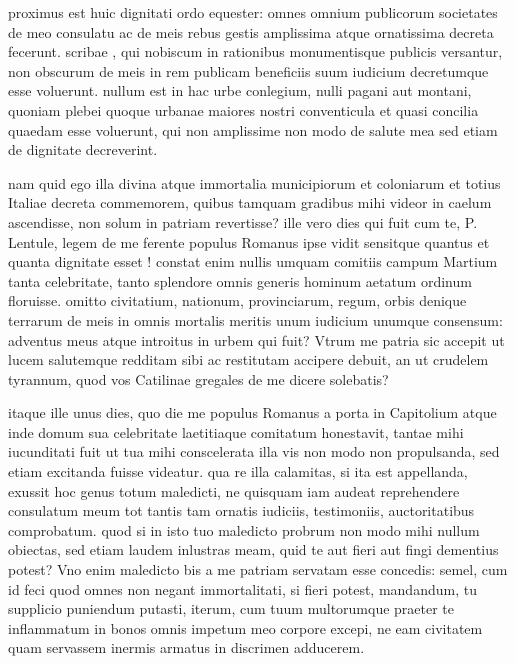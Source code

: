  proximus est huic dignitati ordo equester: omnes omnium publicorum societates de meo consulatu ac de meis rebus gestis amplissima atque ornatissima decreta fecerunt. scribae , qui nobiscum in rationibus monumentisque publicis versantur, non obscurum de meis in rem publicam beneficiis suum iudicium decretumque esse voluerunt. nullum est in hac urbe conlegium, nulli pagani aut montani, quoniam plebei quoque urbanae maiores nostri conventicula et quasi concilia quaedam esse voluerunt, qui non amplissime non modo de salute mea sed etiam de dignitate decreverint.

 nam quid ego illa divina atque immortalia municipiorum et coloniarum et totius Italiae decreta commemorem, quibus tamquam gradibus mihi videor in caelum ascendisse, non solum in patriam revertisse? ille vero dies qui fuit cum te, P. Lentule, legem de me ferente populus Romanus ipse vidit sensitque quantus et quanta dignitate esset ! constat enim nullis umquam comitiis campum Martium tanta celebritate, tanto splendore omnis generis hominum aetatum ordinum floruisse. omitto civitatium, nationum, provinciarum, regum, orbis denique terrarum de meis in omnis mortalis meritis unum iudicium unumque consensum: adventus meus atque introitus in urbem qui fuit? Vtrum me patria sic accepit ut lucem salutemque redditam sibi ac restitutam accipere debuit, an ut crudelem tyrannum, quod vos Catilinae gregales de me dicere solebatis?

 itaque ille unus dies, quo die me populus Romanus a porta in Capitolium atque inde domum sua celebritate laetitiaque comitatum honestavit, tantae mihi iucunditati fuit ut tua mihi conscelerata illa vis non modo non propulsanda, sed etiam excitanda fuisse videatur. qua re illa calamitas, si ita est appellanda, exussit hoc genus totum maledicti, ne quisquam iam audeat reprehendere consulatum meum tot tantis tam ornatis iudiciis, testimoniis, auctoritatibus comprobatum. quod si in isto tuo maledicto probrum non modo mihi nullum obiectas, sed etiam laudem inlustras meam, quid te aut fieri aut fingi dementius potest? Vno enim maledicto bis a me patriam servatam esse concedis: semel, cum id feci quod omnes non negant immortalitati, si fieri potest, mandandum, tu supplicio puniendum putasti, iterum, cum tuum multorumque praeter te inflammatum in bonos omnis impetum meo corpore excepi, ne eam civitatem quam servassem inermis armatus in discrimen adducerem.

